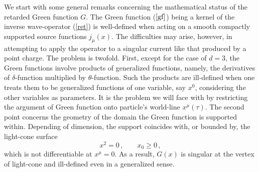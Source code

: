 \documentclass[a4paper,12pt]{article}
\begin{document}
We start with some general remarks concerning the mathematical status of the
retarded Green function $G$. The Green function ($\ref{gf}$) being a kernel
of the inverse wave-operator (\ref{ret}) is well-defined when acting on a
smooth compactly supported source functions $j_\mu(x)$. The difficulties may
arise, however, in attempting to apply the operator to a singular current
like that produced by a point charge. The problem is twofold. First, except
for the case of $d=3$, the Green functions involve products of generalized
functions, namely, the derivatives of $\delta$-function multiplied by $%
\theta $-function. Such the products are ill-defined when one treats them to
be generalized functions of one variable, say $x^0$, considering the other
variables as parameters. It is the problem we will face with by restricting
the argument of Green function onto particle's world-line $x^{\mu}(\tau)$.
The second point concerns the geometry of the domain the Green function is
supported within. Depending of dimension, the support coincides with, or
bounded by, the light-cone surface
\begin{equation}  \label{lc}
x^2=0\,,\;\;\;\;\;\;\;x_0\geq 0\,,
\end{equation}
which is not differentiable at $x^\mu =0$. As a result, $G(x)$ is singular
at the vertex of light-cone and ill-defined even in a generalized sense.
\end{document}

